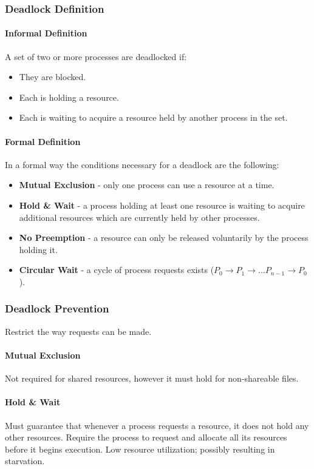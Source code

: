 \subsubsection{Deadlock Definition}
\paragraph{Informal Definition}
A set of two or more processes are deadlocked if:
\begin{itemize}
    \item They are blocked.
    \item Each is holding a resource.
    \item Each is waiting to acquire a resource held by another process in the set.
\end{itemize}
\paragraph{Formal Definition}
In a formal way the conditions necessary for a deadlock are the following:
\begin{itemize}
    \item \textbf{Mutual Exclusion} - only one process can use a resource at a time.
    \item \textbf{Hold \& Wait} - a process holding at least one resource is waiting to acquire additional resources which are currently held by other processes.
    \item \textbf{No Preemption} - a resource can only be released voluntarily by the process holding it.
    \item \textbf{Circular Wait} - a cycle of process requests exists ($P_0 \rightarrow P_1 \rightarrow \dots P_{n-1} \rightarrow P_0$).
\end{itemize}

\subsubsection{Deadlock Prevention}
Restrict the way requests can be made.

\paragraph{Mutual Exclusion}
Not required for shared resources, however it must hold for non-shareable files.

\paragraph{Hold \& Wait}
Must guarantee that whenever a process requests a resource, it does not hold any other resources.
Require the process to request and allocate all its resources before it begins execution.
Low resource utilization; possibly resulting in starvation.

